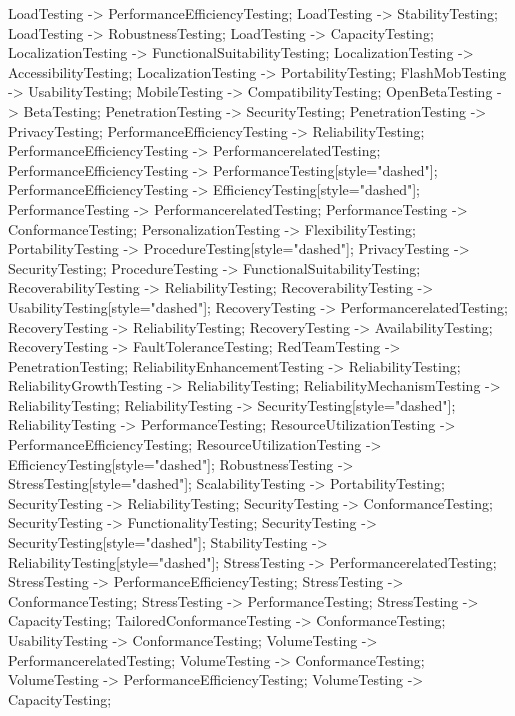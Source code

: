 \documentclass{article}
\begin{document}
{LoadTesting -> PerformanceEfficiencyTesting;
LoadTesting -> StabilityTesting;
LoadTesting -> RobustnessTesting;
LoadTesting -> CapacityTesting;
LocalizationTesting -> FunctionalSuitabilityTesting;
LocalizationTesting -> AccessibilityTesting;
LocalizationTesting -> PortabilityTesting;
FlashMobTesting -> UsabilityTesting;
MobileTesting -> CompatibilityTesting;
OpenBetaTesting -> BetaTesting;
PenetrationTesting -> SecurityTesting;
PenetrationTesting -> PrivacyTesting;
PerformanceEfficiencyTesting -> ReliabilityTesting;
PerformanceEfficiencyTesting -> PerformancerelatedTesting;
PerformanceEfficiencyTesting -> PerformanceTesting[style="dashed"];
PerformanceEfficiencyTesting -> EfficiencyTesting[style="dashed"];
PerformanceTesting -> PerformancerelatedTesting;
PerformanceTesting -> ConformanceTesting;
PersonalizationTesting -> FlexibilityTesting;
PortabilityTesting -> ProcedureTesting[style="dashed"];
PrivacyTesting -> SecurityTesting;
ProcedureTesting -> FunctionalSuitabilityTesting;
RecoverabilityTesting -> ReliabilityTesting;
RecoverabilityTesting -> UsabilityTesting[style="dashed"];
RecoveryTesting -> PerformancerelatedTesting;
RecoveryTesting -> ReliabilityTesting;
RecoveryTesting -> AvailabilityTesting;
RecoveryTesting -> FaultToleranceTesting;
RedTeamTesting -> PenetrationTesting;
ReliabilityEnhancementTesting -> ReliabilityTesting;
ReliabilityGrowthTesting -> ReliabilityTesting;
ReliabilityMechanismTesting -> ReliabilityTesting;
ReliabilityTesting -> SecurityTesting[style="dashed"];
ReliabilityTesting -> PerformanceTesting;
ResourceUtilizationTesting -> PerformanceEfficiencyTesting;
ResourceUtilizationTesting -> EfficiencyTesting[style="dashed"];
RobustnessTesting -> StressTesting[style="dashed"];
ScalabilityTesting -> PortabilityTesting;
SecurityTesting -> ReliabilityTesting;
SecurityTesting -> ConformanceTesting;
SecurityTesting -> FunctionalityTesting;
SecurityTesting -> SecurityTesting[style="dashed"];
StabilityTesting -> ReliabilityTesting[style="dashed"];
StressTesting -> PerformancerelatedTesting;
StressTesting -> PerformanceEfficiencyTesting;
StressTesting -> ConformanceTesting;
StressTesting -> PerformanceTesting;
StressTesting -> CapacityTesting;
TailoredConformanceTesting -> ConformanceTesting;
UsabilityTesting -> ConformanceTesting;
VolumeTesting -> PerformancerelatedTesting;
VolumeTesting -> ConformanceTesting;
VolumeTesting -> PerformanceEfficiencyTesting;
VolumeTesting -> CapacityTesting;

}
\end{document}
